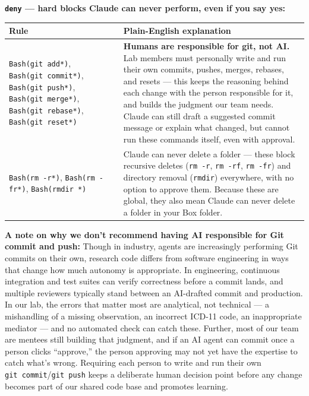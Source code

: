 \documentclass[
]{book}
\newcounter{none} %
\begin{document}
\textbf{\texttt{deny} --- hard blocks Claude can never perform, even if you say yes:}

{\def\LTcaptype{none} %
\begin{longtable}[]{@{}
  >{\raggedright\arraybackslash}p{}
  >{\raggedright\arraybackslash}p{}@{}}
\toprule\noalign{}
\begin{minipage}[b]{\linewidth}\raggedright
Rule
\end{minipage} & \begin{minipage}[b]{\linewidth}\raggedright
Plain-English explanation
\end{minipage} \\
\midrule\noalign{}
\endhead
\bottomrule\noalign{}
\endlastfoot
\texttt{Bash(git\ add*)}, \texttt{Bash(git\ commit*)}, \texttt{Bash(git\ push*)}, \texttt{Bash(git\ merge*)}, \texttt{Bash(git\ rebase*)}, \texttt{Bash(git\ reset*)} & \textbf{Humans are responsible for git, not AI.} Lab members must personally write and run their own commits, pushes, merges, rebases, and resets --- this keeps the reasoning behind each change with the person responsible for it, and builds the judgment our team needs. Claude can still draft a suggested commit message or explain what changed, but cannot run these commands itself, even with approval. \\
\texttt{Bash(rm\ -r*)}, \texttt{Bash(rm\ -fr*)}, \texttt{Bash(rmdir\ *)} & Claude can never delete a folder --- these block recursive deletes (\texttt{rm\ -r}, \texttt{rm\ -rf}, \texttt{rm\ -fr}) and directory removal (\texttt{rmdir}) everywhere, with no option to approve them. Because these are global, they also mean Claude can never delete a folder in your Box folder. \\
\end{longtable}
}

\textbf{A note on why we don't recommend having AI responsible for Git commit and push:} Though in industry, agents are increasingly performing Git commits on their own, research code differs from software engineering in ways that change how much autonomy is appropriate. In engineering, continuous integration and test suites can verify correctness before a commit lands, and multiple reviewers typically stand between an AI-drafted commit and production. In our lab, the errors that matter most are analytical, not technical --- a mishandling of a missing observation, an incorrect ICD-11 code, an inappropriate mediator --- and no automated check can catch these. Further, most of our team are mentees still building that judgment, and if an AI agent can commit once a person clicks ``approve,'' the person approving may not yet have the expertise to catch what's wrong. Requiring each person to write and run their own \texttt{git\ commit}/\texttt{git\ push} keeps a deliberate human decision point before any change becomes part of our shared code base and promotes learning.
\end{document}
